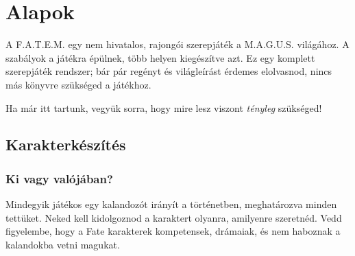 \chapter{Alapok}

A F.A.T.E.M. egy nem hivatalos, rajongói szerepjáték a M.A.G.U.S. világához. A szabályok a  játékra épülnek, több helyen kiegészítve azt. Ez egy komplett szerepjáték rendszer; bár pár regényt és világleírást érdemes elolvasnod, nincs más könyvre szükséged a játékhoz.

Ha már itt tartunk, vegyük sorra, hogy mire lesz viszont \emph{tényleg} szükséged!



\section{Karakterkészítés}

\subsection{Ki vagy valójában?}

Mindegyik játékos egy kalandozót irányít a történetben, meghatározva minden tettüket. Neked kell kidolgoznod a karaktert olyanra, amilyenre szeretnéd. Vedd figyelembe, hogy a Fate karakterek kompetensek, drámaiak, és nem haboznak a kalandokba vetni magukat.


